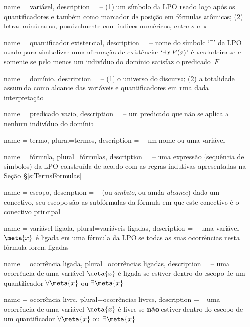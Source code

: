 {
 name = variável,
 description = {-- (1) um símbolo da LPO usado logo após os quantificadores e também como marcador de posição em fórmulas atômicas; (2) letras minúsculas, possivelmente com índices numéricos, entre $s$ e~$z$}
}

{
 name = quantificador existencial,
 description = {-- nome do símbolo `$\exists$' da LPO usado para simbolizar uma afirmação de existência: `$\exists x\, \mathord{F}(x)$' é verdadeira se e somente se pelo menos um indivíduo do domínio satisfaz o predicado~$F$}
}

{
 name = domínio,
 description = {-- (1) o universo do discurso; (2) a totalidade assumida como alcance das variáveis e quantificadores em uma dada interpretação}
}

{
 name = {predicado vazio},
 description = {-- um predicado que não se aplica a nenhum indivíduo do domínio}
}

{
 name = termo,
 plural=termos,
 description = {-- um nome ou uma variável}
}

{
 name = fórmula,
 plural=fórmulas,
 description = {-- uma expressão (sequência de símbolos) da LPO construída de acordo com as regras indutivas apresentadas na Seção~\S\ref{s:TermsFormulas}}
}

{
 name = escopo,
 description = {-- (ou \textit{âmbito}, ou ainda \textit{alcance}) dado um conectivo, seu escopo são as subfórmulas da fórmula em que este conectivo é o conectivo principal}
}

{
 name = variável ligada,
 plural=variáveis ligadas,
 description = {-- uma variável $\meta{x}$ é ligada em uma fórmula da LPO se todas as suas ocorrências nesta fórmula forem ligadas}
}

{
 name = ocorrência ligada,
 plural=ocorrências ligadas,
 description = {-- uma ocorrência de uma variável $\meta{x}$ é ligada se estiver dentro do escopo de um quantificador $\forall{\meta{x}}$ ou $\exists{\meta{x}}$}
}

{
 name = ocorrência livre,
 plural=ocorrências livres,
 description = {-- uma ocorrência de uma variável $\meta{x}$ é livre se \textbf{não} estiver dentro do escopo de um quantificador $\forall{\meta{x}}$ ou $\exists{\meta{x}}$}
}

